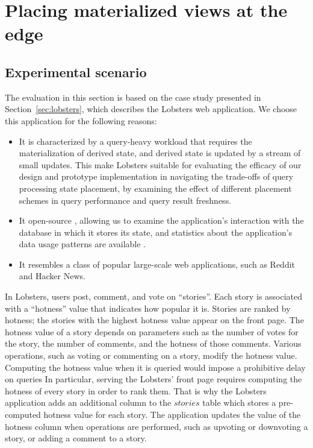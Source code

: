 \section{Placing materialized views at the edge}
\label{sec:eval_1}

\subsection{Experimental scenario}
\label{sec:eval_scenario}

The evaluation in this section is based on the case study presented in Section~\ref{sec:lobsters},
which describes the Lobsters \cite{lobste:rs} web application.
We choose this application for the following reasons:
\begin{itemize}
\item It is characterized by a query-heavy workload that requires the materialization of derived state,
and derived state is updated by a stream of small updates.
This make Lobsters suitable for evaluating the efficacy of our design and prototype implementation in
navigating the trade-offs of query processing state placement,
by examining the effect of different placement schemes in query performance and query result freshness.

\item It open-source \cite{lobsters:source},
allowing us to examine the application's interaction with the database in which it stores its state,
and statistics about the application's data usage patterns are available \cite{lobste:stats}.

\item It resembles a class of popular large-scale web applications, such as Reddit and Hacker News.
\end{itemize}

\bigskip
\noindent
In Lobsters, users post, comment, and vote on ``stories''.
Each story is associated with a ``hotness'' value that indicates how popular it is.
Stories are ranked by hotness;
the stories with the highest hotness value appear on the front page.
The hotness value of a story depends on parameters such as the number of votes for the story,
the number of comments, and the hotness of those comments.
Various operations, such as voting or commenting on a story, modify the hotness value.
Computing the hotness value when it is queried would impose a prohibitive delay on queries
In particular, serving the Lobsters' front page requires computing the hotness of every story in order to rank them.
That is why the Lobsters application adds an additional column to the $stories$ table which stores a pre-computed
hotness value for each story.
The application updates the value of the hotness column when operations are performed,
such as upvoting or downvoting a story, or adding a comment to a story.

